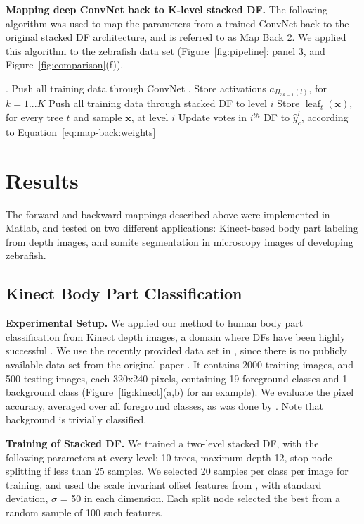 \documentclass[twocolumn]{svjour3}
\DeclareMathOperator{\leaf}{leaf}
\begin{document}
\begin{algorithm}
\caption{\textbf{Mapping deep ConvNet back to K-level stacked DF.} The following algorithm was used to map the parameters from a trained ConvNet back to the original stacked DF architecture, and is referred to as Map Back 2.
We applied this algorithm to the zebrafish data set (Figure~\ref{fig:pipeline}: panel 3, and Figure~\ref{fig:comparison}(f)).}
\begin{algorithmic}
. Push all training data through ConvNet
. Store activations $a_{H_{3k-1}(l)}$, for $k = 1...K$
        \State Push all training data through stacked DF to level $i$
        \State Store $\leaf_t(\mathbf{x})$, for every tree $t$ and sample $\mathbf{x}$, at level $i$
        \State Update votes in $i^{th}$ DF to $\hat{y}^l_c$, according to Equation~\ref{eq:map-back:weights}
      \EndFor
\end{algorithmic}
\label{alg:reweighting}
\end{algorithm}

\section{Results}

The forward and backward mappings described above were implemented in Matlab, and tested on two different applications: Kinect-based body part labeling from depth images, and somite segmentation in microscopy images of developing zebrafish.

\subsection{Kinect Body Part Classification}

\textbf{Experimental Setup. }
We applied our method to human body part classification from Kinect depth images, a domain where DFs have been highly successful \cite{shotton}.
We use the recently provided data set in \cite{denil}, since there is no publicly available data set from the original paper \cite{shotton}.
It contains 2000 training images, and 500 testing images, each 320x240 pixels, containing 19 foreground classes and 1 background class (Figure~\ref{fig:kinect}(a,b) for an example).
We evaluate the pixel accuracy, averaged over all foreground classes, as was done by \cite{denil}.
Note that background is trivially classified.

\textbf{Training of Stacked DF. }
We trained a two-level stacked DF, with the following parameters at every level: 10 trees, maximum depth 12, stop node splitting if less than 25 samples.
We selected 20 samples per class per image for training, and used the scale invariant offset features from \cite{shotton}, with standard deviation, $\sigma$ = 50 in each dimension.
Each split node selected the best from a random sample of 100 such features.
\end{document}
